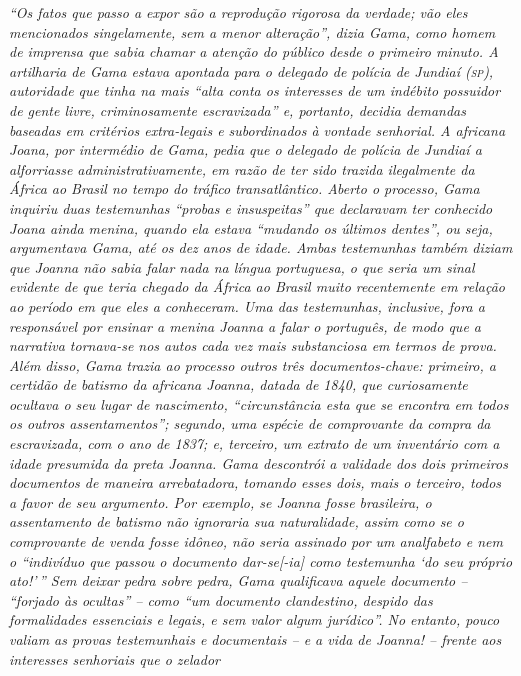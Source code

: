 \begin{didascalia}
\emph{``Os fatos que passo a expor são a reprodução rigorosa da verdade;
vão eles mencionados singelamente, sem a menor alteração'', dizia Gama,
como homem de imprensa que sabia chamar a atenção do público desde o
primeiro minuto. A artilharia de Gama estava apontada para o delegado de
polícia de Jundiaí (\textsc{sp}), autoridade que tinha na mais ``alta conta os
interesses de um indébito possuidor de gente livre, criminosamente
escravizada'' e, portanto, decidia demandas baseadas em critérios
extra-legais e subordinados à vontade senhorial. A africana Joana, por
intermédio de Gama, pedia que o delegado de polícia de Jundiaí a
alforriasse administrativamente, em razão de ter sido trazida
ilegalmente da África ao Brasil no tempo do tráfico transatlântico.
Aberto o processo, Gama inquiriu duas testemunhas ``probas e insuspeitas''
que declaravam ter conhecido Joana ainda menina, quando ela estava
``mudando os últimos dentes'', ou seja, argumentava Gama, até os dez anos
de idade. Ambas testemunhas também diziam que Joanna não sabia falar
nada na língua portuguesa, o que seria um sinal evidente de que teria
chegado da África ao Brasil muito recentemente em relação ao período em
que eles a conheceram. Uma das testemunhas, inclusive, fora a
responsável por ensinar a menina Joanna a falar o português, de modo que
a narrativa tornava-se nos autos cada vez mais substanciosa em termos de
prova. Além disso, Gama trazia ao processo outros três documentos-chave:
primeiro, a certidão de batismo da africana Joanna, datada de 1840, que
curiosamente ocultava o seu lugar de nascimento, ``circunstância esta que
se encontra em todos os outros assentamentos''; segundo, uma espécie de
comprovante da compra da escravizada, com o ano de 1837; e, terceiro, um
extrato de um inventário com a idade presumida da preta Joanna. Gama
descontrói a validade dos dois primeiros documentos de maneira
arrebatadora, tomando esses dois, mais o terceiro, todos a favor de seu
argumento. Por exemplo, se Joanna fosse brasileira, o assentamento de
batismo não ignoraria sua naturalidade, assim como se o comprovante de
venda fosse idôneo, não seria assinado por um analfabeto e nem o
``indivíduo que passou o documento dar-se{[}-ia{]} como testemunha `do
seu próprio ato!'\,'' Sem deixar pedra sobre pedra, Gama qualificava aquele
documento -- ``forjado às ocultas'' -- como ``um documento clandestino,
despido das formalidades essenciais e legais, e sem valor algum
jurídico''. No entanto, pouco valiam as provas testemunhais e documentais
-- e a vida de Joanna! -- frente aos interesses senhoriais que o zelador
}
\end{didascalia}
